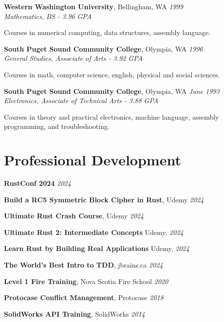 \documentclass[letter,11pt]{article}
\newenvironment{noindentblock}{%
  \begin{list}{}{%
    \setlength{\leftmargin}{0in} %
    \setlength{\rightmargin}{.25in} %
    \setlength{\topsep}{0pt} %
    \setlength{\parsep}{0pt} %
  }
  \item[]}{\end{list}}
\begin{document}
\noindent
\textbf{Western Washington University}, Bellingham, WA \hfill \textit{1999}\\
\textit{Mathematics, BS - 3.96 GPA}
\begin{noindentblock}
Courses in numerical computing, data structures, assembly language.
\end{noindentblock}

\noindent
\textbf{South Puget Sound Community College}, Olympia, WA \hfill \textit{1996}\\
\textit{General Studies, Associate of Arts - 3.92 GPA}
\begin{noindentblock}
Courses in math, computer science, english, physical and social sciences.
\end{noindentblock}

\noindent
\textbf{South Puget Sound Community College}, Olympia, WA \hfill \textit{June 1993}\\
\textit{Electronics, Associate of Technical Arts - 3.88 GPA}
\begin{noindentblock}
Courses in theory and practical electronics, machine language, assembly programming, and troubleshooting.
\end{noindentblock}

\section*{Professional Development}
\noindent
\textbf{RustConf 2024} \hfill \textit{2024}

\noindent
\textbf{Build a RC5 Symmetric Block Cipher in Rust}, Udemy \hfill \textit{2024}

\noindent
\textbf{Ultimate Rust Crash Course}, Udemy \hfill \textit{2024}

\noindent
\textbf{Ultimate Rust 2: Intermediate Concepts} Udemy, \hfill \textit{2024}

\noindent
\textbf{Learn Rust by Building Real Applications} Udemy, \hfill \textit{2024}

\noindent
\textbf{The World's Best Intro to TDD}, jbrains.ca \hfill \textit{2024}

\noindent
\textbf{Level 1 Fire Training}, Nova Scotia Fire School \hfill \textit{2020}

\noindent
\textbf{Protocase Conflict Management}, Protocase \hfill \textit{2018}

\noindent
\textbf{SolidWorks API Training}, SolidWorks \hfill \textit{2014}
\end{document}
